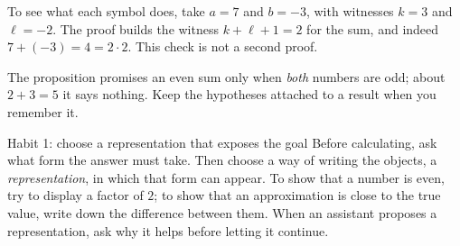 To see what each symbol does, take $a=7$ and $b=-3$, with witnesses $k=3$ and $\ell=-2$. The proof builds the witness $k+\ell+1=2$ for the sum, and indeed $7+(-3)=4=2\cdot2$. This check is not a second proof.

The proposition promises an even sum only when \emph{both} numbers are odd; about $2+3=5$ it says nothing. Keep the hypotheses attached to a result when you remember it.

\begin{principle}{Habit 1: choose a representation that exposes the goal}
Before calculating, ask what form the answer must take. Then choose a way of writing the objects, a \emph{representation}, in which that form can appear. To show that a number is even, try to display a factor of $2$; to show that an approximation is close to the true value, write down the difference between them. When an assistant proposes a representation, ask why it helps before letting it continue.
\end{principle}
